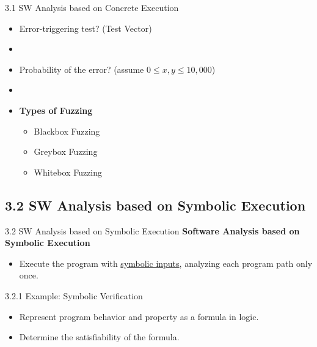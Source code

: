\documentclass[10pt]{beamer}
\begin{document}
	\begin{frame}{3.1 SW Analysis based on Concrete Execution}
		\begin{itemize}
			\item Error-triggering test? (Test Vector)
			\item[] 
			\item Probability of the error? (assume $0\leq x,y\leq 10,000$)
			\item[]
			\item \textbf{Types of Fuzzing} \begin{itemize}
				\item Blackbox Fuzzing
				\item Greybox Fuzzing
				\item Whitebox Fuzzing
			\end{itemize}
		\end{itemize}
	\end{frame}

	\subsection{3.2 SW Analysis based on Symbolic Execution}
	\begin{frame}{3.2 SW Analysis based on Symbolic Execution}
		\textbf{Software Analysis based on Symbolic Execution}
		\begin{itemize}
			\item Execute the program with \underline{symbolic inputs}, analyzing each program path only once.
		\end{itemize}
	\end{frame}
	\begin{frame}{3.2.1 Example: Symbolic Verification}
		\begin{center}
		\end{center}
		\begin{itemize}
			\item Represent program behavior and property as a formula in logic.
			\item Determine the satisfiability of the formula.
		\end{itemize}
	\end{frame}
\end{document}
